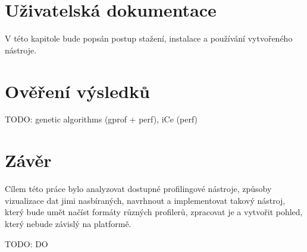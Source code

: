 \documentclass[czech,BP]{thesiskiv}
\begin{document}
\chapter{Uživatelská dokumentace}

V této kapitole bude popsán postup stažení, instalace a používání vytvořeného nástroje. 





\chapter{Ověření výsledků}

TODO: genetic algorithms (gprof + perf), iCe (perf)





\newpage

\chapter{Závěr}

Cílem této práce bylo analyzovat dostupné profilingové nástroje, způsoby vizualizace dat jimi nasbíraných, navrhnout a implementovat takový nástroj, který bude umět načíst formáty různých profilerů, zpracovat je a vytvořit pohled, který nebude závislý na platformě.

TODO: DO



\newpage


{\raggedright\small

}







\newenvironment{seznamzkratek}[1]%
  {%
    \chapter*{Seznam zkratek}
    \addcontentsline{toc}{chapter}{Seznam zkratek}
    \begin{acronym}[#1]
  }{%
    \end{acronym}
    \newpage
  }%
\newcommand{\novazkratka}[3]%
  {\acro{#1}[#2]{#3}}
\newcommand{\zkratka}[1]%
  {\ac{#1}}
\newcommand{\zk}[1]%
  {\acs{#1}}
\newcommand{\zkratkatext}[1]%
  {\acl{#1}}
\end{document}
